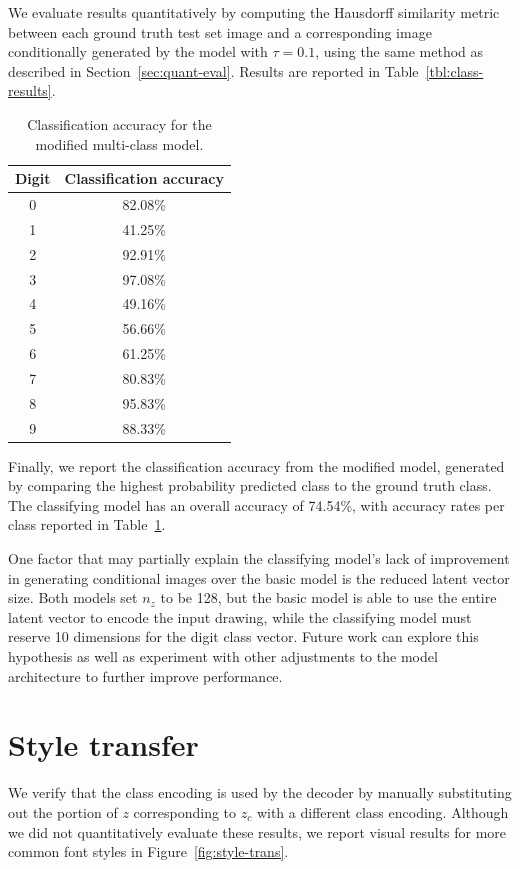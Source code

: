 We evaluate results quantitatively by computing the Hausdorff similarity metric between each ground truth test set image and a corresponding image conditionally generated by the model with $\tau = 0.1$, using the same method as described in Section~\ref{sec:quant-eval}. Results are reported in Table~\ref{tbl:class-results}.

\begin{table}[h]
\centering
\caption[Classification accuracy for the modified multi-class model]
    {Classification accuracy for the modified multi-class model.\label{tbl:class-acc}}
\begin{tabular}{c c}
\toprule
    Digit & Classification accuracy \\ \midrule
    0 & 82.08\% \\
    1 & 41.25\% \\
    2 & 92.91\% \\
    3 & 97.08\% \\
    4 & 49.16\% \\
    5 & 56.66\% \\
    6 & 61.25\% \\
    7 & 80.83\% \\
    8 & 95.83\% \\
    9 & 88.33\%
\end{tabular}
\end{table}

Finally, we report the classification accuracy from the modified model, generated by comparing the highest probability predicted class to the ground truth class. The classifying model has an overall accuracy of 74.54\%, with accuracy rates per class reported in Table~\ref{tbl:class-acc}.

One factor that may partially explain the classifying model's lack of improvement in generating conditional images over the basic model is the reduced latent vector size.
Both models set $n_z$ to be 128, but the basic model is able to use the entire latent vector to encode the input drawing, while the classifying model must reserve 10 dimensions for the digit class vector.
Future work can explore this hypothesis as well as experiment with other adjustments to the model architecture to further improve performance.

\section{Style transfer}
We verify that the class encoding is used by the decoder by manually substituting out the portion of $z$ corresponding to $z_c$ with a different class encoding.
Although we did not quantitatively evaluate these results, we report visual results for more common font styles in Figure~\ref{fig:style-trans}. 


